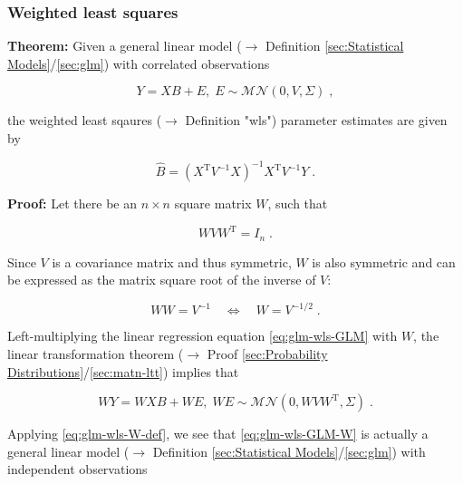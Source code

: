 \documentclass[a4paper,12pt,twoside]{book}
\begin{document}
\subsubsection[\textbf{Weighted least squares}]{Weighted least squares} \label{sec:glm-wls}
\setcounter{equation}{0}

\textbf{Theorem:} Given a general linear model ($\rightarrow$ Definition \ref{sec:Statistical Models}/\ref{sec:glm}) with correlated observations

\begin{equation} \label{eq:glm-wls-GLM}
Y = X B + E, \; E \sim \mathcal{MN}(0, V, \Sigma) \; ,
\end{equation}

the weighted least sqaures ($\rightarrow$ Definition "wls") parameter estimates are given by

\begin{equation} \label{eq:glm-wls-WLS}
\hat{B} = (X^\mathrm{T} V^{-1} X)^{-1} X^\mathrm{T} V^{-1} Y \; .
\end{equation}


\vspace{1em}
\textbf{Proof:} Let there be an $n \times n$ square matrix $W$, such that

\begin{equation} \label{eq:glm-wls-W-def}
W V W^\mathrm{T} = I_n \; .
\end{equation}

Since $V$ is a covariance matrix and thus symmetric, $W$ is also symmetric and can be expressed as the matrix square root of the inverse of $V$:

\begin{equation} \label{eq:glm-wls-W-V}
W W = V^{-1} \quad \Leftrightarrow \quad W = V^{-1/2} \; .
\end{equation}

Left-multiplying the linear regression equation \eqref{eq:glm-wls-GLM} with $W$, the linear transformation theorem ($\rightarrow$ Proof \ref{sec:Probability Distributions}/\ref{sec:matn-ltt}) implies that

\begin{equation} \label{eq:glm-wls-GLM-W}
WY = WXB + WE, \; WE \sim \mathcal{MN}(0, W V W^\mathrm{T}, \Sigma) \; .
\end{equation}

Applying \eqref{eq:glm-wls-W-def}, we see that \eqref{eq:glm-wls-GLM-W} is actually a general linear model ($\rightarrow$ Definition \ref{sec:Statistical Models}/\ref{sec:glm}) with independent observations
\end{document}
